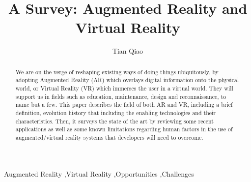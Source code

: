 \documentclass[preprint,12pt]{elsarticle}
\begin{document}
\begin{frontmatter}



\title{A Survey: Augmented Reality and Virtual Reality}


\author{Tian Qiao}


\begin{abstract}
We are on the verge of reshaping existing ways of doing things ubiquitously, by adopting Augmented Reality (AR) which overlays digital information onto the physical world, or Virtual Reality (VR) which immerses the user in a virtual world. They will support us in fields such as education, maintenance, design and reconnaissance, to name but a few. This paper describes the field of both AR and VR, including a brief definition, evolution history that including the enabling technologies and their characteristics. Then, it surveys the state of the art by reviewing some recent applications as well as some known limitations regarding human factors in the use of augmented/virtual reality systems that developers will need to overcome.
\end{abstract}

\begin{keyword}
Augmented Reality \sep Virtual Reality \sep Opportunities \sep Challenges
\end{keyword}




\end{frontmatter}
\end{document}
